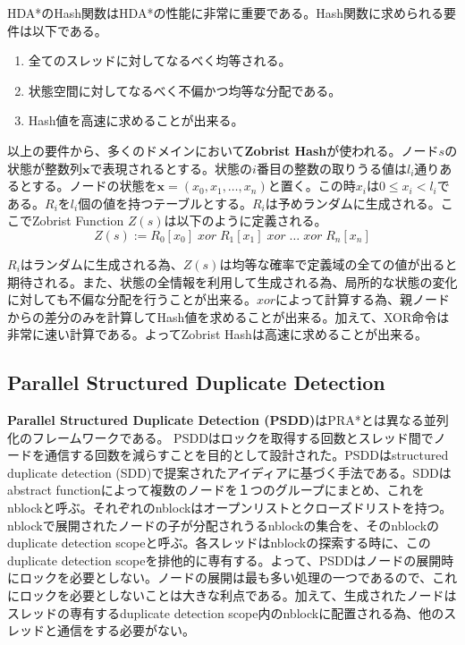\documentclass[uplatex]{jsarticle}
\begin{document}
\vspace{5mm}

HDA*のHash関数はHDA*の性能に非常に重要である。Hash関数に求められる要件は以下である。

\begin{enumerate}
	\item 全てのスレッドに対してなるべく均等される。
	\item 状態空間に対してなるべく不偏かつ均等な分配である。
	\item Hash値を高速に求めることが出来る。
\end{enumerate}

以上の要件から、多くのドメインにおいて\textbf{Zobrist Hash}が使われる\cite{Zobrist1970}。ノード$s$の状態が整数列$\mathbf{x}$で表現されるとする。状態の$i$番目の整数の取りうる値は$l_{i}$通りあるとする。ノードの状態を$\mathbf{x} = (x_{0}, x_{1}, …, x_{n})$と置く。この時$x_{i}$は$0 \leq x_{i} < l_{i}$である。$R_{i}$を$l_{i}$個の値を持つテーブルとする。$R_{i}$は予めランダムに生成される。ここでZobrist Function $Z(s)$は以下のように定義される。
\newline
\begin{equation}
	Z(s) := R_{0}[x_{0}]\; xor\; R_{1}[x_{1}]\; xor\; …\; xor\; R_{n}[x_{n}]%
\end{equation}

$R_{i}$はランダムに生成される為、$Z(s)$は均等な確率で定義域の全ての値が出ると期待される。また、状態の全情報を利用して生成される為、局所的な状態の変化に対しても不偏な分配を行うことが出来る。$xor$によって計算する為、親ノードからの差分のみを計算してHash値を求めることが出来る。加えて、XOR命令は非常に速い計算である。よってZobrist Hashは高速に求めることが出来る。


\subsection{Parallel Structured Duplicate Detection}
\textbf{Parallel Structured Duplicate Detection (PSDD)}はPRA*とは異なる並列化のフレームワークである\cite{zhou2007parallel}。
PSDDはロックを取得する回数とスレッド間でノードを通信する回数を減らすことを目的として設計された。PSDDはstructured duplicate detection (SDD)で提案されたアイディアに基づく手法である\cite{zhou2004structured}。SDDはabstract functionによって複数のノードを１つのグループにまとめ、これをnblockと呼ぶ。それぞれのnblockはオープンリストとクローズドリストを持つ。nblockで展開されたノードの子が分配されうるnblockの集合を、そのnblockのduplicate detection scopeと呼ぶ。各スレッドはnblockの探索する時に、このduplicate detection scopeを排他的に専有する。よって、PSDDはノードの展開時にロックを必要としない。ノードの展開は最も多い処理の一つであるので、これにロックを必要としないことは大きな利点である。加えて、生成されたノードはスレッドの専有するduplicate detection scope内のnblockに配置される為、他のスレッドと通信をする必要がない。
\end{document}
